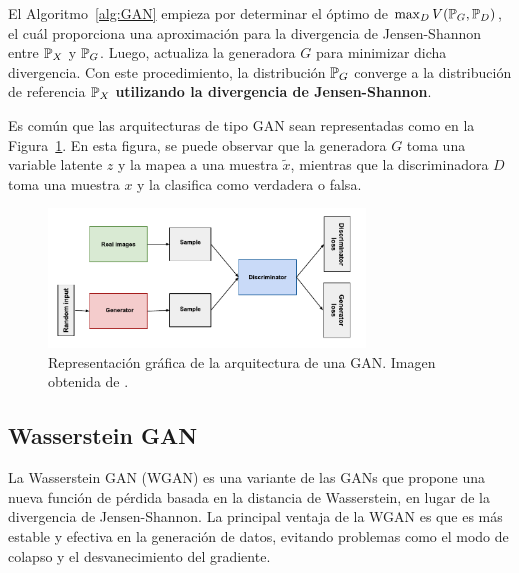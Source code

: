 \begin{remark}
	El Algoritmo~\ref{alg:GAN} empieza por determinar el óptimo de $\max_D V( \Prob_G , \Prob_D )$, el cuál proporciona una aproximación para la divergencia de Jensen-Shannon entre $\Prob_X$ y $\Prob_G$. Luego, actualiza la generadora $G$ para minimizar dicha divergencia. Con este procedimiento, la distribución $\Prob_G$ converge a la distribución de referencia $\Prob_X$ \textbf{utilizando la divergencia de Jensen-Shannon}.
\end{remark}

Es común que las arquitecturas de tipo GAN sean representadas como en la Figura~\ref{fig:gan-diagram}. En esta figura, se puede observar que la generadora $G$ toma una variable latente $z$ y la mapea a una muestra $\tilde x$, mientras que la discriminadora $D$ toma una muestra $x$ y la clasifica como verdadera o falsa.

\begin{figure}[thb!]
	\centering
	\includegraphics[width=0.75\textwidth]{img/gan/gan_diagram.pdf}
	\caption{Representación gráfica de la arquitectura de una GAN. Imagen obtenida de \cite{googlegan}.}
	\label{fig:gan-diagram}
\end{figure}





\subsection{Wasserstein GAN}\label{ssec:wasserstein-gan}  %

La Wasserstein GAN (WGAN) \cite{arjovsky2017wasserstein} es una variante de las GANs que propone una nueva función de pérdida basada en la distancia de Wasserstein, en lugar de la divergencia de Jensen-Shannon. La principal ventaja de la WGAN es que es más estable y efectiva en la generación de datos, evitando problemas como el modo de colapso y el desvanecimiento del gradiente.

